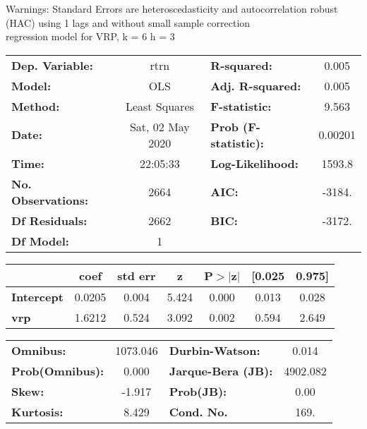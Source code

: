 Warnings: \newline
 [1] Standard Errors are heteroscedasticity and autocorrelation robust (HAC) using 1 lags and without small sample correction\\ 

regression model for VRP, k = 6 h = 3\begin{center}
\begin{tabular}{lclc}
\toprule
\textbf{Dep. Variable:}    &       rtrn       & \textbf{  R-squared:         } &     0.005   \\
\textbf{Model:}            &       OLS        & \textbf{  Adj. R-squared:    } &     0.005   \\
\textbf{Method:}           &  Least Squares   & \textbf{  F-statistic:       } &     9.563   \\
\textbf{Date:}             & Sat, 02 May 2020 & \textbf{  Prob (F-statistic):} &  0.00201    \\
\textbf{Time:}             &     22:05:33     & \textbf{  Log-Likelihood:    } &    1593.8   \\
\textbf{No. Observations:} &        2664      & \textbf{  AIC:               } &    -3184.   \\
\textbf{Df Residuals:}     &        2662      & \textbf{  BIC:               } &    -3172.   \\
\textbf{Df Model:}         &           1      & \textbf{                     } &             \\
\bottomrule
\end{tabular}
\begin{tabular}{lcccccc}
                   & \textbf{coef} & \textbf{std err} & \textbf{z} & \textbf{P$> |$z$|$} & \textbf{[0.025} & \textbf{0.975]}  \\
\midrule
\textbf{Intercept} &       0.0205  &        0.004     &     5.424  &         0.000        &        0.013    &        0.028     \\
\textbf{vrp}       &       1.6212  &        0.524     &     3.092  &         0.002        &        0.594    &        2.649     \\
\bottomrule
\end{tabular}
\begin{tabular}{lclc}
\textbf{Omnibus:}       & 1073.046 & \textbf{  Durbin-Watson:     } &    0.014  \\
\textbf{Prob(Omnibus):} &   0.000  & \textbf{  Jarque-Bera (JB):  } & 4902.082  \\
\textbf{Skew:}          &  -1.917  & \textbf{  Prob(JB):          } &     0.00  \\
\textbf{Kurtosis:}      &   8.429  & \textbf{  Cond. No.          } &     169.  \\
\bottomrule
\end{tabular}
\end{center}

